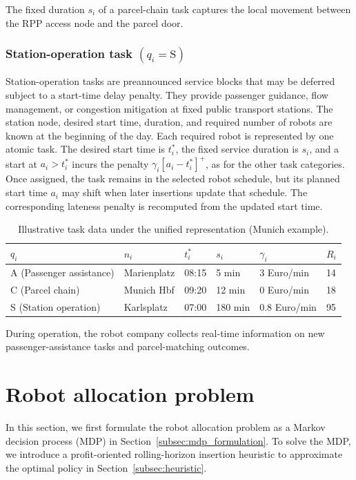 \documentclass[11pt,oneside]{article}
\begin{document}
The fixed duration \(s_i\) of a parcel-chain task captures the local movement
between the RPP access node and the parcel door.


\subsubsection{Station-operation task
\((q_i=\mathrm{S})\)}
Station-operation tasks are preannounced service blocks that may be deferred
subject to a start-time delay penalty. They provide passenger guidance, flow
management, or congestion mitigation at fixed public transport stations. The
station node, desired start time, duration, and required number of robots are
known at the beginning of the day. Each required robot is represented by one
atomic task. The desired start time is \(t_i^*\), the fixed service duration is
\(s_i\), and a start at \(a_i>t_i^*\) incurs the penalty
\(\gamma_i[a_i-t_i^*]^+\), as for the other task categories. Once assigned,
the task remains in the selected robot schedule, but its planned start time
\(a_i\) may shift when later insertions update that schedule. The corresponding
lateness penalty is recomputed from the updated start time.

\begin{table}[htbp]
\centering
\caption{Illustrative task data under the unified representation (Munich example).}
\label{tab:task_tuple_examples}
\begin{tabular}{l l l l l l}
\hline
$q_i$ & $n_i$ & $t_i^*$ & $s_i$ & $\gamma_i$ & $R_i$ \\
\hline
$\mathrm{A}$ (Passenger assistance) & Marienplatz & 08:15 & 5 min & 3 Euro/min & 14 \\
$\mathrm{C}$ (Parcel chain) & Munich Hbf & 09:20 & 12 min & 0 Euro/min & 18 \\
$\mathrm{S}$ (Station operation) & Karlsplatz & 07:00 & 180 min & 0.8 Euro/min & 95 \\
\hline
\end{tabular}%
\end{table}


During operation, the robot
company collects real-time information on
new passenger-assistance tasks and parcel-matching outcomes.



\section{Robot allocation problem}
\label{sec:mdp_formulation}
In this section, we first formulate the robot allocation problem as a Markov
decision process (MDP) in Section~\ref{subsec:mdp_formulation}. To solve the MDP, we introduce a profit-oriented rolling-horizon insertion heuristic to approximate the optimal policy in Section~\ref{subsec:heuristic}.
\end{document}
